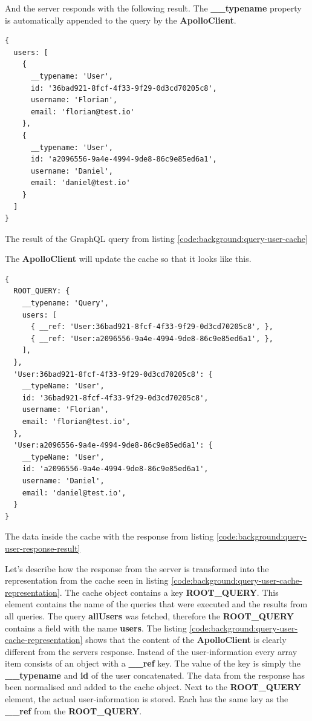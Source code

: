 And the server responds with the following result. The \textbf{\_\_typename} property is automatically appended to the query by the \textbf{ApolloClient}.

\ifshowListings
\begin{listing}[H]
\begin{verbatim}
{
  users: [
    {
      __typename: 'User',
      id: '36bad921-8fcf-4f33-9f29-0d3cd70205c8',
      username: 'Florian',
      email: 'florian@test.io'
    }, 
    {
      __typename: 'User',
      id: 'a2096556-9a4e-4994-9de8-86c9e85ed6a1',
      username: 'Daniel',
      email: 'daniel@test.io'
    }
  ]
}
\end{verbatim}
\caption{The result of the GraphQL query from listing \ref{code:background:query-user-cache}}\label{code:background:query-user-response-result}
\end{listing}
\fi

The \textbf{ApolloClient} will update the cache so that it looks like this.

\ifshowListings
\begin{listing}[H]
\begin{verbatim}
{
  ROOT_QUERY: {
    __typename: 'Query',
    users: [
      { __ref: 'User:36bad921-8fcf-4f33-9f29-0d3cd70205c8', },
      { __ref: 'User:a2096556-9a4e-4994-9de8-86c9e85ed6a1', },
    ],
  },
  'User:36bad921-8fcf-4f33-9f29-0d3cd70205c8': {
    __typeName: 'User',
    id: '36bad921-8fcf-4f33-9f29-0d3cd70205c8',
    username: 'Florian',
    email: 'florian@test.io',
  },
  'User:a2096556-9a4e-4994-9de8-86c9e85ed6a1': {
    __typeName: 'User',
    id: 'a2096556-9a4e-4994-9de8-86c9e85ed6a1',
    username: 'Daniel',
    email: 'daniel@test.io',
  }
}
\end{verbatim}
\caption{The data inside the cache with the response from listing \ref{code:background:query-user-response-result}}\label{code:background:query-user-cache-representation}
\end{listing}
\fi

Let's describe how the response from the server is transformed into the representation from the cache seen in listing \ref{code:background:query-user-cache-representation}. The cache object contains a key \textbf{ROOT\_QUERY}. This element contains the name of the queries that were executed and the results from all queries. The query \textbf{allUsers} was fetched, therefore the \textbf{ROOT\_QUERY} contains a field with the name \textbf{users}. The listing \ref{code:background:query-user-cache-representation} shows that the content of the \textbf{ApolloClient} is clearly different from the servers response. Instead of the user-information every array item consists of an object with a \textbf{\_\_ref} key. The value of the key is simply the \textbf{\_\_typename} and \textbf{id} of the user concatenated. The data from the response has been normalised and added to the cache object. Next to the \textbf{ROOT\_QUERY} element, the actual user-information is stored. Each has the same key as the \textbf{\_\_ref} from the \textbf{ROOT\_QUERY}. 

